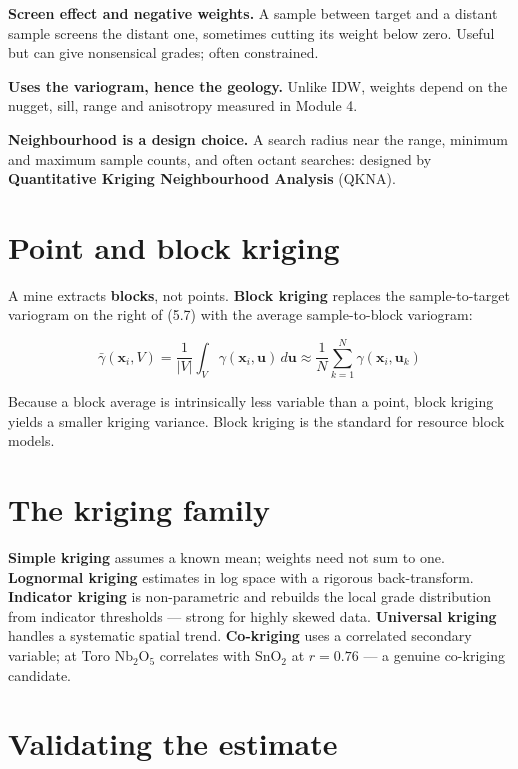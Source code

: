 \documentclass[11pt]{article}
\begin{document}
\textbf{Screen effect and negative weights.} A sample between target and
a distant sample screens the distant one, sometimes cutting its weight
below zero. Useful but can give nonsensical grades; often constrained.

\textbf{Uses the variogram, hence the geology.} Unlike IDW, weights
depend on the nugget, sill, range and anisotropy measured in Module 4.

\textbf{Neighbourhood is a design choice.} A search radius near the
range, minimum and maximum sample counts, and often octant searches:
designed by \textbf{Quantitative Kriging Neighbourhood Analysis} (QKNA).

\section{Point and block kriging}

A mine extracts \textbf{blocks}, not points. \textbf{Block kriging}
replaces the sample-to-target variogram on the right of (5.7) with the
average sample-to-block variogram:

\begin{eqbox}
\[ \bar{\gamma}(\mathbf{x}_i,V)=\frac{1}{|V|}\int_{V}
   \gamma(\mathbf{x}_i,\mathbf{u})\,d\mathbf{u}
   \approx \frac{1}{N}\sum_{k=1}^{N}\gamma(\mathbf{x}_i,\mathbf{u}_k)
   \tag{5.10}\]
\end{eqbox}

Because a block average is intrinsically less variable than a point,
block kriging yields a smaller kriging variance. Block kriging is the
standard for resource block models.

\section{The kriging family}

\textbf{Simple kriging} assumes a known mean; weights need not sum to
one. \textbf{Lognormal kriging} estimates in log space with a rigorous
back-transform. \textbf{Indicator kriging} is non-parametric and
rebuilds the local grade distribution from indicator thresholds ---
strong for highly skewed data. \textbf{Universal kriging} handles a
systematic spatial trend. \textbf{Co-kriging} uses a correlated secondary
variable; at Toro Nb$_2$O$_5$ correlates with SnO$_2$ at $r=0.76$ ---
a genuine co-kriging candidate.

\section{Validating the estimate}
\end{document}
